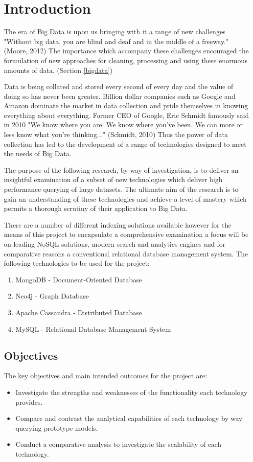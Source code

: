 
\chapter{Introduction}
The era of Big Data is upon us bringing with it a range of new challenges "Without big data, you are blind and deaf and in the middle of a freeway." (Moore, 2012) The importance which accompany these challenges encouraged the formulation of new approaches for cleaning, processing and using these enormous amounts of data. (Section \ref{bigdata})

Data is being collated and stored every second of every day and the value of doing so has never been greater. Billion dollar companies such as Google and Amazon dominate the market in data collection and pride themselves in knowing everything about everything. Former CEO of Google, Eric Schmidt famously said in 2010 "We know where you are. We know where you've been. We can more or less know what you're thinking..." (Schmidt, 2010) Thus the power of data collection has led to the development of a range of technologies designed to meet the needs of Big Data.

The purpose of the following research, by way of investigation, is to deliver an insightful examination of a subset of new technologies which deliver high performance querying of large datasets. The ultimate aim of the research is to gain an understanding of these technologies and achieve a level of mastery which permits a thorough scrutiny of their application to Big Data.

There are a number of different indexing solutions available however for the means of this project to encapsulate a comprehensive examination a focus will be on leading NoSQL solutions, modern search and analytics engines and for comparative reasons a conventional relational database management system. The following technologies to be used for the project: 
\begin{enumerate}
\item MongoDB - Document-Oriented Database 
\item Neo4j - Graph Database
\item Apache Cassandra - Distributed Database
\item MySQL - Relational Database Management System
\end{enumerate}

\section{Objectives}
The key objectives and main intended outcomes for the project are:
\begin{itemize}
\item Investigate the strengths and weaknesses of the functionality each technology provides.
\item Compare and contrast the analytical capabilities of each technology by way querying prototype models.
\item Conduct a comparative analysis to investigate the scalability of each technology.
\end{itemize}

